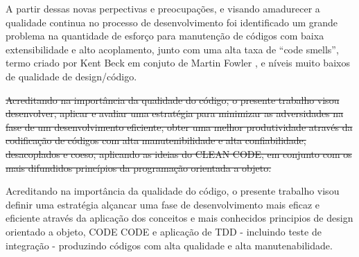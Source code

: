 \documentclass[12pt]{article}
\begin{document}
A partir dessas novas perpectivas e preocupações, e visando amadurecer a qualidade continua no processo de desenvolvimento foi identificado um grande problema na quantidade de esforço para manutenção de códigos com baixa extensibilidade e alto acoplamento, junto com uma alta taxa de “code smells”, termo criado por Kent Beck em conjuto de Martin Fowler \cite{MARTIN_FOWLER_REFACTORING}, e níveis muito baixos de qualidade de design/código.


\sout{Acreditando na importância da qualidade do código, o presente trabalho visou desenvolver, aplicar e avaliar uma estratégia para minimizar as adversidades na fase de um desenvolvimento eficiente, obter uma melhor produtividade através da codificação de códigos com alta manutenibilidade e alta confiabilidade, desacoplados e coeso, aplicando as ideias do CLEAN CODE, em conjunto com os mais difundidos princípios da programação orientada a objeto.}

Acreditando na importância da qualidade do código, o presente trabalho visou definir uma estratégia alçancar uma fase de desenvolvimento mais eficaz e eficiente através da aplicação dos conceitos e mais conhecidos principios de design orientado a objeto, CODE CODE e aplicação de TDD - incluindo teste de integração - produzindo códigos com alta qualidade e alta manutenabilidade.
\end{document}
